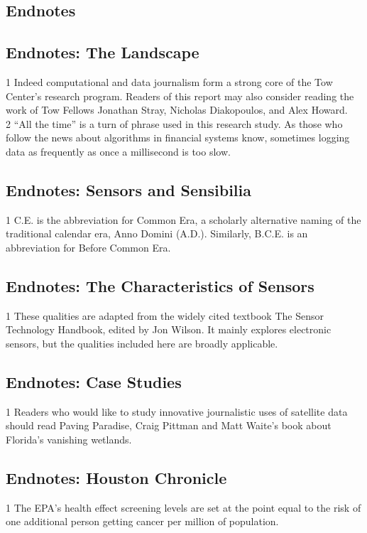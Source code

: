 \begin{itemize}
\chapter{Endnotes}


\section{Endnotes: The Landscape}
1 Indeed computational and data journalism form a strong core of the Tow Center's research program. Readers of this report may also consider reading the work of Tow Fellows Jonathan Stray, Nicholas Diakopoulos, and Alex Howard.\\
2 ``All the time'' is a turn of phrase used in this research study. As those who follow the news about algorithms in financial systems know, sometimes logging data as frequently as once a millisecond
is too slow.\\

\section{Endnotes: Sensors and Sensibilia}
1 C.E. is the abbreviation for Common Era, a scholarly alternative naming of the traditional calendar era, Anno Domini (A.D.). Similarly, B.C.E. is an abbreviation for Before Common Era.\\

\section{Endnotes: The Characteristics of Sensors}
1 These qualities are adapted from the widely cited textbook The Sensor Technology Handbook,
edited by Jon Wilson. It mainly explores electronic sensors, but the qualities included here are
broadly applicable.\\

\section{Endnotes: Case Studies}
1 Readers who would like to study innovative journalistic uses of satellite data should read Paving Paradise, Craig Pittman and Matt Waite's book about Florida's vanishing wetlands.\\

\section{Endnotes: Houston Chronicle}
1 The EPA's health effect screening levels are set at the point equal to the risk of one additional
person getting cancer per million of population.\\



\end{itemize}
